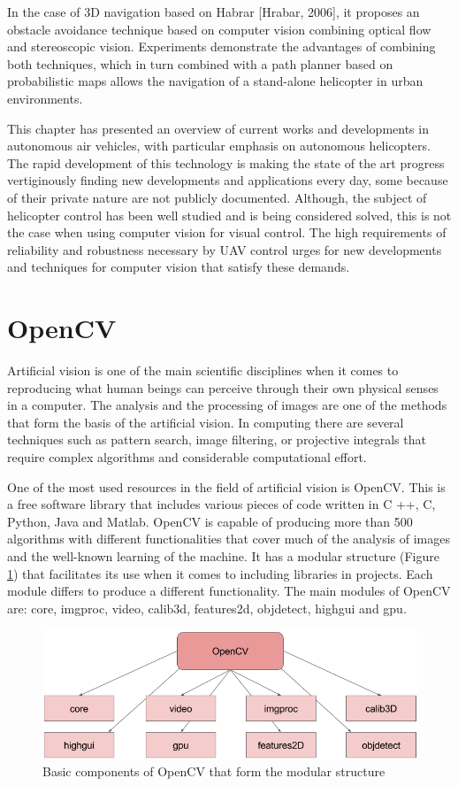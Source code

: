 In the case of 3D navigation based on Habrar [Hrabar, 2006], it proposes an obstacle avoidance technique based on computer vision combining optical flow and stereoscopic vision. Experiments demonstrate the advantages of combining both techniques, which in turn combined with a path planner based on probabilistic maps allows the navigation of a stand-alone helicopter in urban environments.

This chapter has presented an overview of current works and developments in autonomous air vehicles, with particular emphasis on autonomous helicopters. The rapid development of this technology is making the state of the art progress vertiginously finding new developments and applications every day, some because of their private nature are not publicly documented. Although, the subject of helicopter control has been well studied and is being considered solved, this is not the case when using computer vision for visual control. The high requirements of reliability and robustness necessary by UAV control urges for new developments and techniques for computer vision that satisfy these demands.


\section{OpenCV}

Artificial vision is one of the main scientific disciplines when it comes to reproducing what human beings can perceive through their own physical senses in a computer. The analysis and the processing of images are one of the methods that form the basis of the artificial vision. In computing there are several techniques such as pattern search, image filtering, or projective integrals  that require complex algorithms and considerable computational effort.

One of the most used resources in the field of artificial vision is OpenCV. This is a free software library that includes various pieces of code written in C ++, C, Python, Java and Matlab. OpenCV is capable of producing more than 500 algorithms with different functionalities that cover much of the analysis of images and the well-known learning of the machine. It has a modular structure (Figure \ref{opencv_structure}) that facilitates its use when it comes to including libraries in projects. Each module differs to produce a different functionality. The main modules of OpenCV are: core, imgproc, video, calib3d, features2d, objdetect, highgui and gpu.

\begin{figure}[h!]
\centering
\includegraphics[scale=0.7]{figures/opencv_structure.png}
\caption{Basic components of OpenCV that form the modular structure}
\label{opencv_structure}
\end{figure}

